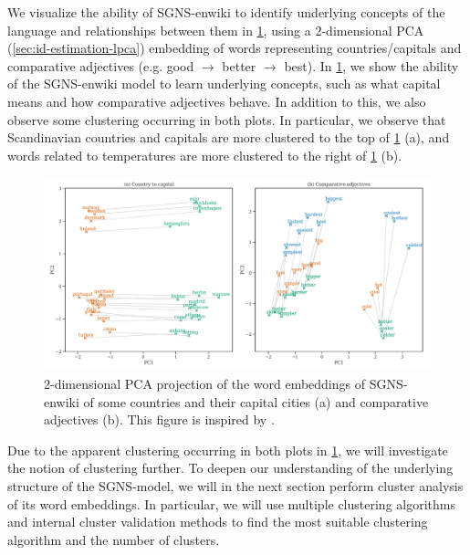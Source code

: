 We visualize the ability of SGNS-enwiki to identify underlying concepts of the language and relationships between them in \cref{fig:sgns-enwiki-word-to-word-relations-pca-2d}, using a 2-dimensional PCA (\cref{sec:id-estimation-lpca}) embedding of words representing countries/capitals and comparative adjectives (e.g. good $\rightarrow$ better $\rightarrow$ best). In \cref{fig:sgns-enwiki-word-to-word-relations-pca-2d}, we show the ability of the SGNS-enwiki model to learn underlying concepts, such as what capital means and how comparative adjectives behave. In addition to this, we also observe some clustering occurring in both plots. In particular, we observe that Scandinavian countries and capitals are more clustered to the top of \cref{fig:sgns-enwiki-word-to-word-relations-pca-2d} (a), and words related to temperatures are more clustered to the right of \cref{fig:sgns-enwiki-word-to-word-relations-pca-2d} (b).
\begin{figure}[H]
   \centering
   \includegraphics[width=\textwidth]{thesis/figures/word-to-word-relationships-pca-2d.pdf}
 \caption{2-dimensional PCA projection of the word embeddings of SGNS-enwiki of some countries and their capital cities (a) and comparative adjectives (b). This figure is inspired by \cite[Figure 2]{mikolov2013b}.}
 \label{fig:sgns-enwiki-word-to-word-relations-pca-2d}
\end{figure}

Due to the apparent clustering occurring in both plots in \cref{fig:sgns-enwiki-word-to-word-relations-pca-2d}, we will investigate the notion of clustering further. To deepen our understanding of the underlying structure of the SGNS-model, we will in the next section perform cluster analysis of its word embeddings. In particular, we will use multiple clustering algorithms and internal cluster validation methods to find the most suitable clustering algorithm and the number of clusters.
